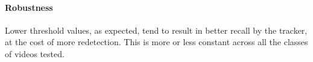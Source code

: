 \paragraph{Robustness}
%     
Lower threshold values, as expected, tend to result in better recall by the tracker, at the cost of more redetection. This is more or less constant across all the classes of videos tested.

